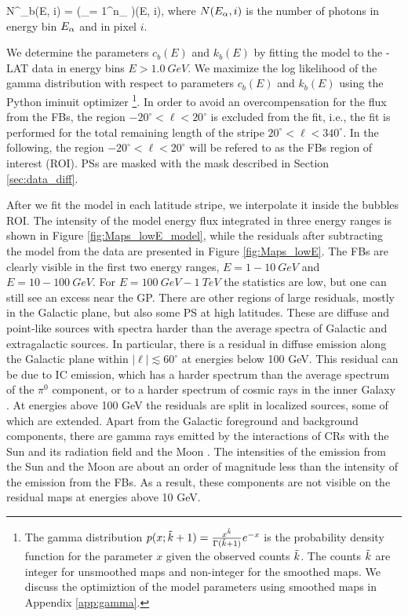 \be
\tilde N^\low_b(E, i) =  \left(\sum_{\alpha = 1}^{n_\low}  \right)\tau(E, i),
\ee
where $N(E_\alpha, i)$ is the number of photons in energy bin $E_\alpha$ and in pixel $i$.

We determine the parameters $c_{b}(E)$ and $k_{b}(E)$ by fitting the model to the \Fermi-LAT data in energy bins $E > \SI{1.0}{GeV}$.
We maximize the log likelihood of the gamma distribution 
with respect to parameters $c_{b}(E)$ and $k_{b}(E)$
using the Python iminuit optimizer%
\footnote{
The gamma distribution $p(x; \tilde{k} + 1) = \frac{x^{\tilde{k}}}{\Gamma (\tilde{k} + 1)}e^{-x}$ is the probability density function
for the parameter $x$ given the observed counts $\tilde{k}$.
The counts $\tilde{k}$ are integer for unsmoothed maps and non-integer for the smoothed maps.
We discuss the optimiztion of the model parameters using smoothed maps in 
Appendix \ref{app:gamma}.
}.
In order to avoid an overcompensation 
for the flux from the FBs, the region $-20^\circ < \ell < 20^\circ$
is excluded from the fit, i.e., the fit is performed for 
the total remaining length of the stripe $20^\circ < \ell < 340^\circ$.
In the following, the region $-20^\circ < \ell < 20^\circ$ will be refered to as the FBs region of interest (ROI).
PSs are masked with the mask described in Section \ref{sec:data_diff}.


After we fit the model in each latitude stripe, we interpolate it inside the bubbles ROI.
The intensity of the model energy flux integrated in three energy ranges
is shown in Figure \ref{fig:Maps_lowE_model},
while the residuals after subtracting the model from the data are presented in Figure \ref{fig:Maps_lowE}.
The FBs are clearly visible in the first two energy ranges, $E = 1 - \SI{10}{GeV}$ and $E = 10 - \SI{100}{GeV}$.
For $E = \SI{100}{GeV} - \SI{1}{TeV}$ the statistics are low, but one can still see an excess near the GP.
There are other regions of large residuals, mostly in the Galactic plane, but also some PS at high latitudes.
These are diffuse and point-like sources with spectra harder than the average spectra of Galactic and
extragalactic sources.
In particular, there is a residual in diffuse emission along the Galactic plane within $|\ell | \lesssim 60^\circ$ at energies below 100 GeV.
This residual can be due to IC emission, which has a harder spectrum than the average spectrum of the $\pi^0$ component,
or to a harder spectrum of cosmic rays in the inner Galaxy \citep{2015PhRvD..91h3012G, 2016ApJS..223...26A}.
At energies above 100 GeV the residuals are split in localized sources, some of which are extended.
Apart from the Galactic foreground and background components, there are gamma rays emitted by the interactions of CRs with 
the Sun and its radiation field \citep{2011ApJ...734..116A} and the Moon \citep{2016PhRvD..93h2001A}.
The intensities of the emission from the Sun and the Moon are about an order of magnitude less than 
the intensity of the emission from the FBs. 
As a result, these components are not visible on  the residual maps at energies above 10 GeV.

